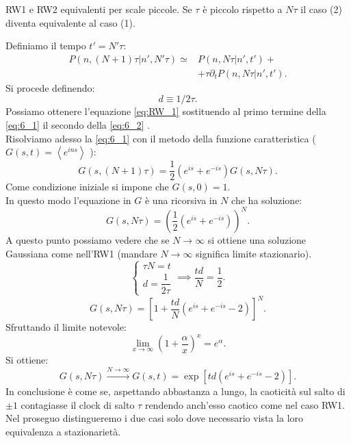 \begin{greenbox}{RW1 e RW2 equivalenti per scale piccole.}
 Se $\tau$ è piccolo rispetto a $N\tau$ il caso (2) diventa equivalente al caso (1).   
\end{greenbox}
\noindent
Definiamo il tempo $t' = N'\tau$:
\begin{equation}
\begin{aligned}
    P\left(n,(N+1) \tau|n',N'\tau\right)\simeq & P\left(n,N\tau|n',t'\right) + \\
					       & + \tau\partial_{t}P\left(n,N\tau|n',t'\right) \label{eq:6_2}
.\end{aligned}
\end{equation}
Si procede definendo: 
\[
 d \equiv 1 /2\tau   
.\] 
Possiamo ottenere l'equazione \ref{eq:RW_1} sostituendo al primo termine della \ref{eq:6_1} il secondo della \ref{eq:6_2} .\\
Risolviamo adesso la \ref{eq:6_1} con il metodo della funzione caratteristica ($G(s,t) = \left<e^{ins}\right>$ ):
\[
    G(s, (N+1)\tau) = \frac{1}{2}\left(e^{is}+ e^{-is}\right)G(s,N\tau) 
.\] 
Come condizione iniziale si impone che $G(s,0) = 1$.\\
In questo modo l'equazione in $G$ è una ricorsiva in $N$ che ha soluzione:
\[
    G(s,N\tau) = \left(\frac{1}{2}\left(e^{is}+e^{-is}\right)\right)^{N}
.\] 
A questo punto possiamo vedere che se $N\to \infty$ si ottiene una soluzione Gaussiana come nell'RW1 (mandare $N\to \infty$ significa limite stazionario).
\[
    \begin{cases}
        \tau N = t\\
	d = \dfrac{1}{2\tau}
    \end{cases}
    \implies  
    \frac{td}{N} = \frac{1}{2}
.\] 
\[
    G(s,N\tau) = \left[1 + \frac{td}{N}\left(e^{is}+ e^{-is}-2\right)\right]^N
.\] 
Sfruttando il limite notevole:
\[
    \lim_{x \to \infty} \left(1+\frac{\alpha}{x}\right)^{x} = e^{\alpha}
.\] 
Si ottiene:
\[
    G(s, N\tau) \xrightarrow[]{N \to \infty} G(s,t) = \exp\left[td\left(e^{is}+e^{-is}-2\right)\right]
.\] 
In conclusione è come se, aspettando abbastanza a lungo, la caoticità sul salto di $\pm 1$ contagiasse il clock di salto $\tau$ rendendo anch'esso caotico come nel caso RW1.\\
Nel proseguo distingueremo i due casi solo dove necessario vista la loro equivalenza a stazionarietà.

